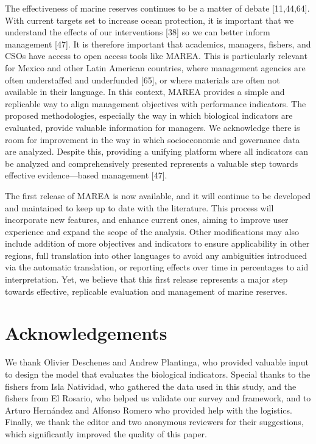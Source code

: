 \documentclass[12pt,]{article}
\begin{document}
The effectiveness of marine reserves continues to be a matter of debate
{[}11,44,64{]}. With current targets set to increase ocean protection,
it is important that we understand the effects of our interventions
{[}38{]} so we can better inform management {[}47{]}. It is therefore
important that academics, managers, fishers, and CSOs have access to
open access tools like MAREA. This is particularly relevant for Mexico
and other Latin American countries, where management agencies are often
understaffed and underfunded {[}65{]}, or where materials are often not
available in their language. In this context, MAREA provides a simple
and replicable way to align management objectives with performance
indicators. The proposed methodologies, especially the way in which
biological indicators are evaluated, provide valuable information for
managers. We acknowledge there is room for improvement in the way in
which socioeconomic and governance data are analyzed. Despite this,
providing a unifying platform where all indicators can be analyzed and
comprehensively presented represents a valuable step towards effective
evidence---based management {[}47{]}.

The first release of MAREA is now available, and it will continue to be
developed and maintained to keep up to date with the literature. This
process will incorporate new features, and enhance current ones, aiming
to improve user experience and expand the scope of the analysis. Other
modifications may also include addition of more objectives and
indicators to ensure applicability in other regions, full translation
into other languages to avoid any ambiguities introduced via the
automatic translation, or reporting effects over time in percentages to
aid interpretation. Yet, we believe that this first release represents a
major step towards effective, replicable evaluation and management of
marine reserves.

\section{Acknowledgements}\label{acknowledgements}

We thank Olivier Deschenes and Andrew Plantinga, who provided valuable
input to design the model that evaluates the biological indicators.
Special thanks to the fishers from Isla Natividad, who gathered the data
used in this study, and the fishers from El Rosario, who helped us
validate our survey and framework, and to Arturo Hernández and Alfonso
Romero who provided help with the logistics. Finally, we thank the
editor and two anonymous reviewers for their suggestions, which
significantly improved the quality of this paper.
\end{document}

